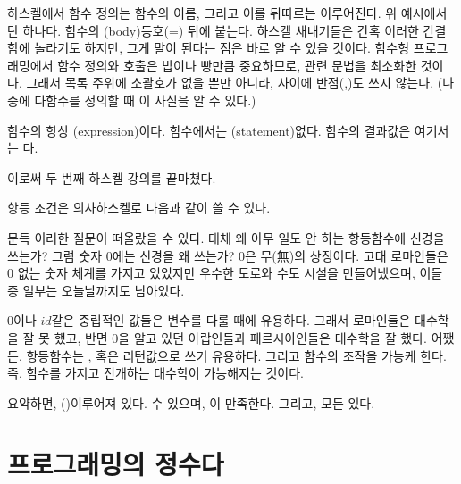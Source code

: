 하스켈에서 함수 정의는 함수의 이름, 그리고 이를 뒤따르는 \trFormalParameter\로 이루어진다.
위 예시에서 \trFormalParameter\는  단 하나다.
함수의 \trFunctionBody(body)\는 등호(=) 뒤에 붙는다.
하스켈 새내기들은 간혹 이러한 간결함에 놀라기도 하지만, 그게 말이 된다는 점은 바로 알 수 있을 것이다.
함수형 프로그래밍에서 함수 정의와 호출은 밥이나 빵만큼 중요하므로, 관련 문법을 최소화한 것이다.
그래서 \trArgument 목록 주위에 소괄호가 없을 뿐만 아니라, \trArgument 사이에 반점(,)도 쓰지 않는다.
(나중에 다\trArgument 함수를 정의할 때 이 사실을 알 수 있다.)

함수의 \trFunctionBody\는 항상 \trExpression(expression)이다. 함수에서는 \trStatement(statement)\는 없다. 
함수의 결과값은  여기서는 다.

이로써 두 번째 하스켈 강의를 끝마쳤다.

항등 조건은 의사하스켈로 다음과 같이 쓸 수 있다.

문득 이러한 질문이 떠올랐을 수 있다. 대체 왜 아무 일도 안 하는 항등함수에 신경을 쓰는가?
그럼 숫자 0에는 신경을 왜 쓰는가? 0은 무(無)의 상징이다. 고대 로마인들은 0 없는 숫자 체계를 가지고 있었지만
우수한 도로와 수도 시설을 만들어냈으며, 이들 중 일부는 오늘날까지도 남아있다.

0이나 $id$같은 중립적인 값들은 \trSymbolic 변수를 다룰 때에 유용하다.
그래서 로마인들은 대수학을 잘 못 했고, 반면 0을 알고 있던 아랍인들과 페르시아인들은 대수학을 잘 했다.
어쨌든, 항등함수는  \trArgument, 혹은 리턴값으로 쓰기 유용하다. 
그리고 \trHigherOrderFunction\가 함수의  조작을 가능케 한다.
즉, 함수를 가지고 전개하는 대수학이 가능해지는 것이다.

요약하면, \trCategory\는 \trObject\와 \trArrow(\trMorphism)\로 이루어져 있다.
\trArrow\는  수 있으며, 이 \trComposition\은 \trAssociativity\을 만족한다.
그리고, 모든    \trIdentity \trArrow\가 있다.

\section{\trComposition\은 프로그래밍의 정수다}

